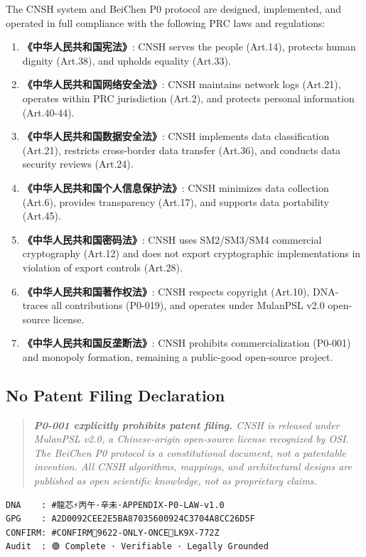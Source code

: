 \begin{tcolorbox}[
  colback=jadeGreen!6,
  colframe=jadeGreen!60,
  title={\textbf{PRC Law Compliance Declaration}},
  fonttitle=\small\bfseries
]
\small
The CNSH system and BeiChen P0 protocol are designed, implemented,
and operated in full compliance with the following PRC laws and
regulations:

\begin{enumerate}\itemsep2pt
  \item \textbf{《中华人民共和国宪法》}: CNSH serves the people
    (Art.14), protects human dignity (Art.38), and upholds
    equality (Art.33).
  \item \textbf{《中华人民共和国网络安全法》}: CNSH maintains
    network logs (Art.21), operates within PRC jurisdiction
    (Art.2), and protects personal information (Art.40-44).
  \item \textbf{《中华人民共和国数据安全法》}: CNSH implements
    data classification (Art.21), restricts cross-border data
    transfer (Art.36), and conducts data security reviews (Art.24).
  \item \textbf{《中华人民共和国个人信息保护法》}: CNSH minimizes
    data collection (Art.6), provides transparency (Art.17),
    and supports data portability (Art.45).
  \item \textbf{《中华人民共和国密码法》}: CNSH uses
    SM2/SM3/SM4 commercial cryptography (Art.12) and does not
    export cryptographic implementations in violation of
    export controls (Art.28).
  \item \textbf{《中华人民共和国著作权法》}: CNSH respects
    copyright (Art.10), DNA-traces all contributions (P0-019),
    and operates under MulanPSL v2.0 open-source license.
  \item \textbf{《中华人民共和国反垄断法》}: CNSH prohibits
    commercialization (P0-001) and monopoly formation,
    remaining a public-good open-source project.
\end{enumerate}
\end{tcolorbox}

\subsection{No Patent Filing Declaration}

\begin{quote}
\itshape
\textbf{P0-001 explicitly prohibits patent filing.}
CNSH is released under MulanPSL v2.0, a Chinese-origin
open-source license recognized by OSI.
The BeiChen P0 protocol is a constitutional document, not a
patentable invention.
All CNSH algorithms, mappings, and architectural designs
are published as open scientific knowledge, not as
proprietary claims.
\end{quote}

\begin{small}
\begin{verbatim}
DNA    : #龍芯⚡️丙午·辛未·APPENDIX-P0-LAW-v1.0
GPG    : A2D0092CEE2E5BA87035600924C3704A8CC26D5F
CONFIRM: #CONFIRM🌌9622-ONLY-ONCE🧬LK9X-772Z
Audit  : 🟢 Complete · Verifiable · Legally Grounded
\end{verbatim}
\end{small}
